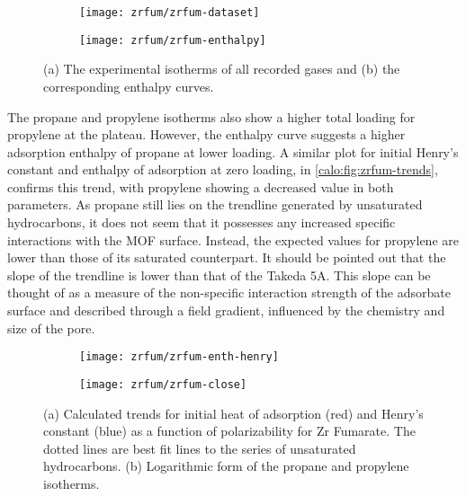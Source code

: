 \begin{figure}[htb]
    \centering

	\begin{subfigure}[b]{.45\textwidth}
        \centering
        \texttt{[image: zrfum/zrfum-dataset]}
        \caption{}%
        \label{calo:fig:zrfum-dataset}
    \end{subfigure}%
	\quad
	\begin{subfigure}[b]{.45\textwidth}
        \centering
        \texttt{[image: zrfum/zrfum-enthalpy]}
        \caption{}%
        \label{calo:fig:zrfum-enthalpy}
    \end{subfigure}
    \caption{(a) The experimental isotherms of all recorded gases and
    (b) the corresponding enthalpy curves.}%
    \label{calo:fig:zrfum-data}

\end{figure}

The propane and propylene isotherms also show a higher total
loading for propylene at the plateau. However, the enthalpy
curve suggests a higher adsorption enthalpy of propane at lower
loading. A similar plot for initial Henry's constant and
enthalpy of adsorption at zero loading, in \autoref{calo:fig:zrfum-trends},
confirms this trend, with propylene showing a decreased value
in both parameters. As propane still lies on the trendline generated
by unsaturated hydrocarbons, it does not seem that it possesses any
increased specific interactions with the \gls{MOF} surface. Instead, 
the expected values for propylene are lower than those of its
saturated counterpart. It should be pointed out that the
slope of the trendline is lower than that of the Takeda 5A. This slope 
can be thought of as a measure of the non-specific interaction strength
of the adsorbate surface and described through a field gradient,
influenced by the chemistry and size of the pore.

\begin{figure}[htb]
    \centering
    
    \begin{subfigure}[b]{0.5\textwidth}
        \centering
        \texttt{[image: zrfum/zrfum-enth-henry]}
        \caption{}%
        \label{calo:fig:zrfum-trends}
    \end{subfigure}%
    \begin{subfigure}[b]{0.45\textwidth}
        \centering
        \texttt{[image: zrfum/zrfum-close]}
        \caption{}%
        \label{calo:fig:zrfum-close}
    \end{subfigure}%
    \caption{(a) Calculated trends for initial heat of adsorption (red) and 
    Henry's constant (blue) as a function of polarizability for 
    Zr Fumarate. The dotted lines are best fit lines to 
    the series of unsaturated hydrocarbons. (b) Logarithmic form of the 
    propane and propylene isotherms.}%
    \label{calo:fig:zrfum-analysis}

\end{figure}

